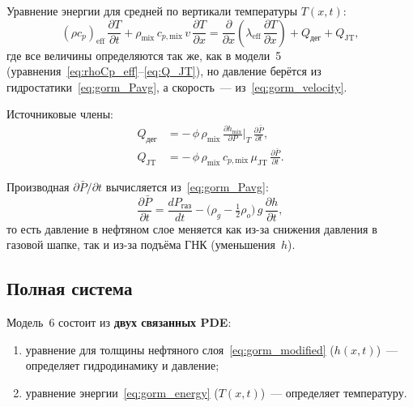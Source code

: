 \documentclass[12pt,a4paper]{article}
\begin{document}
Уравнение энергии для средней по вертикали температуры $T(x,t)$:
\begin{equation}\label{eq:gorm_energy}
  \boxed{\;
    (\rho c_p)_{\mathrm{eff}}\,\frac{\partial T}{\partial t}
    + \rho_{\mathrm{mix}}\,c_{p,\mathrm{mix}}\,v\,
      \frac{\partial T}{\partial x}
    = \frac{\partial}{\partial x}
      \left(\lambda_{\mathrm{eff}}\,
      \frac{\partial T}{\partial x}\right)
    + Q_{\text{дег}} + Q_{\mathrm{JT}},
  \;}
\end{equation}
где все величины определяются так же, как в модели~5
(уравнения~\eqref{eq:rhoCp_eff}--\eqref{eq:Q_JT}), но давление
берётся из гидростатики~\eqref{eq:gorm_Pavg}, а скорость~---
из~\eqref{eq:gorm_velocity}.

Источниковые члены:
\begin{align}
  Q_{\text{дег}} &= -\,\phi\,\rho_{\mathrm{mix}}\,
    \frac{\partial h_{\mathrm{mix}}}{\partial P}\bigg|_T\,
    \frac{\partial \bar{P}}{\partial t},
    \label{eq:gorm_Qdeg} \\[4pt]
  Q_{\mathrm{JT}} &= -\,\phi\,\rho_{\mathrm{mix}}\,
    c_{p,\mathrm{mix}}\,\mu_{\mathrm{JT}}\,
    \frac{\partial \bar{P}}{\partial t}.
    \label{eq:gorm_QJT}
\end{align}

Производная $\partial\bar{P}/\partial t$ вычисляется
из~\eqref{eq:gorm_Pavg}:
\begin{equation}\label{eq:dPdt_gorm}
  \frac{\partial\bar{P}}{\partial t}
    = \frac{dP_{\text{газ}}}{dt}
    - \bigl(\rho_g - \tfrac{1}{2}\rho_o\bigr)\,g\,
      \frac{\partial h}{\partial t},
\end{equation}
то есть давление в нефтяном слое меняется как из-за снижения давления
в газовой шапке, так и из-за подъёма ГНК (уменьшения~$h$).

\subsection{Полная система}

Модель~6 состоит из \textbf{двух связанных PDE}:
\begin{enumerate}[nosep]
  \item уравнение для толщины нефтяного слоя~\eqref{eq:gorm_modified}
        ($h(x,t)$)~--- определяет гидродинамику и давление;
  \item уравнение энергии~\eqref{eq:gorm_energy}
        ($T(x,t)$)~--- определяет температуру.
\end{enumerate}
\end{document}

